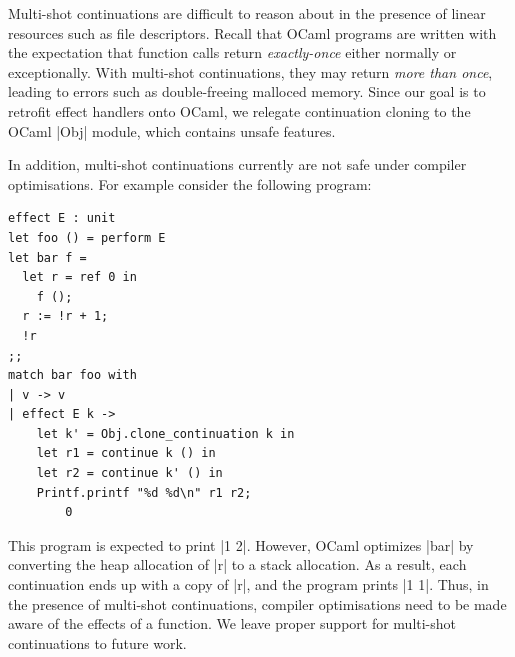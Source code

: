 \documentclass[sigplan,screen]{acmart}
\begin{document}
Multi-shot continuations are difficult to
reason about in the presence of linear resources such as file descriptors.
Recall that OCaml programs are written with the expectation that function calls
return \emph{exactly-once} either normally or exceptionally. With multi-shot
continuations, they may return \emph{more than once}, leading to errors such as
double-freeing malloced memory. Since our goal is to retrofit effect handlers
onto OCaml, we relegate continuation cloning to the OCaml |Obj| module, which
contains unsafe features.

In addition, multi-shot continuations currently are not safe under compiler
optimisations. For example consider the following program:

\begin{minipage}{\linewidth}
\begin{lstlisting}
effect E : unit
let foo () = perform E
let bar f =
  let r = ref 0 in
	f ();
  r := !r + 1;
  !r
;;
match bar foo with
| v -> v
| effect E k ->
    let k' = Obj.clone_continuation k in
    let r1 = continue k () in
    let r2 = continue k' () in
    Printf.printf "%d %d\n" r1 r2;
		0
\end{lstlisting}
\end{minipage}

This program is expected to print |1 2|. However, OCaml optimizes |bar| by
converting the heap allocation of |r| to a stack allocation. As a result, each
continuation ends up with a copy of |r|, and the program prints |1 1|. Thus, in
the presence of multi-shot continuations, compiler optimisations need to be
made aware of the effects of a function. We leave proper support for multi-shot
continuations to future work.
\end{document}
